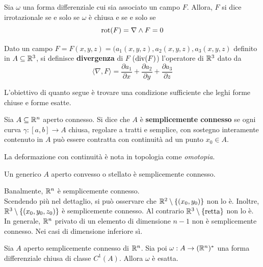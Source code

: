 \begin{definition} \label{Def: Campo irrotazionale}
    Sia $\omega$ una forma differenziale cui sia associato un campo $F$. Allora, $F$ si dice irrotazionale se e solo se $\omega$ è chiusa e se e solo se
    \begin{equation}
      \operatorname{rot}(F) = \nabla \wedge F = 0  
    \end{equation}
\end{definition}
\begin{definition} \label{Def: Divergenza}
    Dato un campo $F= F(x,y,z)= (a_1(x,y,z), a_2(x,y,z), a_3(x,y,z)$ definito in $A \subseteq \mathbb{R}^3$, si definisce \textbf{divergenza} di $F$ ($\operatorname{div}(F)$) l'operatore di $\mathbb{R}^3$ dato da
    \begin{equation}
        \langle \nabla, F \rangle = \frac{\partial a_1}{\partial x} + \frac{\partial a_2}{\partial y} + \frac{\partial a_3}{\partial z}
    \end{equation}
\end{definition}
L'obiettivo di quanto segue è trovare una condizione sufficiente che leghi forme chiuse e forme esatte. 
\begin{definition}
    Sia $A \subseteq \mathbb{R}^n$ aperto connesso. Si dice che $A$ è \textbf{semplicemente connesso} se ogni curva $\gamma:[a,b] \to A$ chiusa, regolare a tratti e semplice, con sostegno interamente contenuto in $A$ può essere contratta con continuità ad un punto $x_0 \in A$.
\end{definition}
\begin{oss}
    La deformazione con continuità è nota in topologia come \textit{omotopia}.
\end{oss}
\begin{oss}
    Un generico $A$ aperto convesso o stellato è semplicemente connesso.
\end{oss}
\begin{example}
    Banalmente, $\mathbb{R}^n$ è semplicemente connesso.\\
    Scendendo più nel dettaglio, si può osservare che $\mathbb{R}^2 \setminus \left\{(x_0,y_0)\right\}$ non lo è.
    Inoltre, $\mathbb{R}^3 \setminus \left\{(x_0, y_0, z_0)\right\}$ è semplicemente connesso. Al contrario $\mathbb{R}^3 \setminus \left\{\text{retta}\right\}$ non lo è.\\
    In generale, $\mathbb{R}^n$ privato di un elemento di dimensione $n-1$ non è semplicemente connesso. Nei casi di dimensione inferiore sì.
\end{example}
\begin{theorem} \label{Teo: Forma chiusa => forma esatta in spazi semplicemente connessi}
    Sia $A$ aperto semplicemente connesso di $\mathbb{R}^n$. Sia poi $\omega: A \to (\mathbb{R}^n)^*$ una forma differenziale chiusa di classe $C^1(A)$. Allora $\omega$ è esatta.
\end{theorem}
